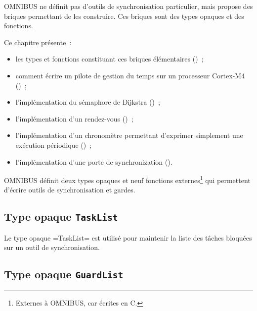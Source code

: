 





OMNIBUS ne définit pas d'outils de synchronisation particulier, mais propose des briques permettant de les construire. Ces briques sont des types opaques et des fonctions.

Ce chapitre présente~:
\begin{itemize}
  \item les types et fonctions constituant ces briques élémentaires ()~;
  \item comment écrire un pilote de gestion du temps sur un processeur Cortex-M4 ()~;
  \item l'implémentation du sémaphore de Dijkstra ()~;
  \item l'implémentation d'un rendez-vous ()~;
  \item l'implémentation d'un chronomètre permettant d'exprimer simplement une exécution périodique ()~;
  \item l'implémentation d'une porte de synchronization ().
\end{itemize}











OMNIBUS définit deux types opaques et neuf fonctions externes\footnote{Externes à OMNIBUS, car écrites en C.} qui permettent d'écrire outils de synchronisation et gardes.

\subsection{Type opaque \texttt{TaskList}}

Le type opaque \omnibus=TaskList= est utilisé pour maintenir la liste des tâches bloquées sur un outil de synchronisation.


\subsection{Type opaque \texttt{GuardList}}

